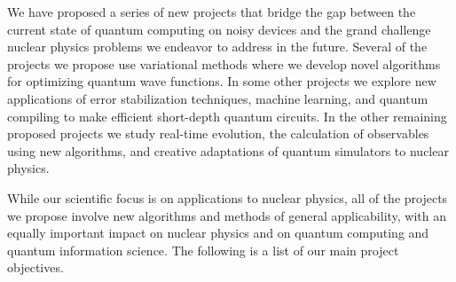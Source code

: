 \documentclass[11pt]{article}
\begin{document}
We have proposed a series of new projects that bridge the gap between the current state of quantum computing on noisy devices and the grand challenge nuclear physics problems we endeavor to address in the future.  Several of the projects we propose use variational methods where we develop novel algorithms for optimizing quantum wave functions.  In some other projects we explore new applications of error stabilization techniques, machine learning, and quantum compiling to make efficient short-depth quantum circuits. In the other remaining proposed projects we study real-time evolution, the calculation of observables using new algorithms, and creative adaptations of quantum simulators to nuclear physics. 

While our scientific focus is on applications to nuclear physics, all of the projects we propose involve new algorithms and methods of general applicability, with an equally important impact on nuclear physics and on quantum computing and quantum information science.  The following is a list of our main project objectives.
\end{document}
